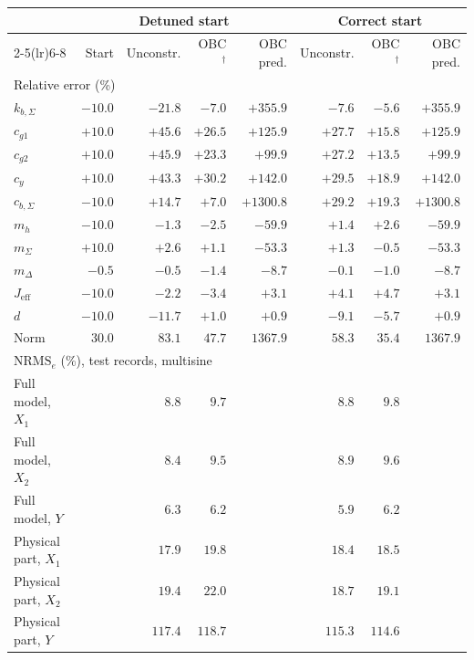 \setlength{\tabcolsep}{3pt}
\begin{tabular}{l r r r r r r r}
\toprule
 & \multicolumn{4}{c}{Detuned start} & \multicolumn{3}{c}{Correct start}\\
\cmidrule(lr){2-5}\cmidrule(lr){6-8}
 & Start & Unconstr. & OBC$^\dagger$ & OBC pred. & Unconstr. & OBC$^\dagger$ & OBC pred.\\
\midrule
\multicolumn{8}{l}{Relative error (\%)}\\
$k_{b,\Sigma}$ & $-10.0$ & $-21.8$ & $-7.0$ & $+355.9$ & $-7.6$ & $-5.6$ & $+355.9$\\
$c_{g1}$ & $+10.0$ & $+45.6$ & $+26.5$ & $+125.9$ & $+27.7$ & $+15.8$ & $+125.9$\\
$c_{g2}$ & $+10.0$ & $+45.9$ & $+23.3$ & $+99.9$ & $+27.2$ & $+13.5$ & $+99.9$\\
$c_y$ & $+10.0$ & $+43.3$ & $+30.2$ & $+142.0$ & $+29.5$ & $+18.9$ & $+142.0$\\
$c_{b,\Sigma}$ & $-10.0$ & $+14.7$ & $+7.0$ & $+1300.8$ & $+29.2$ & $+19.3$ & $+1300.8$\\
$m_h$ & $-10.0$ & $-1.3$ & $-2.5$ & $-59.9$ & $+1.4$ & $+2.6$ & $-59.9$\\
$m_\Sigma$ & $+10.0$ & $+2.6$ & $+1.1$ & $-53.3$ & $+1.3$ & $-0.5$ & $-53.3$\\
$m_\Delta$ & $-0.5$ & $-0.5$ & $-1.4$ & $-8.7$ & $-0.1$ & $-1.0$ & $-8.7$\\
$J_{\mathrm{eff}}$ & $-10.0$ & $-2.2$ & $-3.4$ & $+3.1$ & $+4.1$ & $+4.7$ & $+3.1$\\
$d$ & $-10.0$ & $-11.7$ & $+1.0$ & $+0.9$ & $-9.1$ & $-5.7$ & $+0.9$\\
Norm & $30.0$ & $83.1$ & $47.7$ & $1367.9$ & $58.3$ & $35.4$ & $1367.9$\\
\midrule
\multicolumn{8}{l}{$\mathrm{NRMS}_e$ (\%), test records, multisine}\\
Full model, $X_1$ &  & $8.8$ & $9.7$ &  & $8.8$ & $9.8$ & \\
Full model, $X_2$ &  & $8.4$ & $9.5$ &  & $8.9$ & $9.6$ & \\
Full model, $Y$ &  & $6.3$ & $6.2$ &  & $5.9$ & $6.2$ & \\
Physical part, $X_1$ &  & $17.9$ & $19.8$ &  & $18.4$ & $18.5$ & \\
Physical part, $X_2$ &  & $19.4$ & $22.0$ &  & $18.7$ & $19.1$ & \\
Physical part, $Y$ &  & $117.4$ & $118.7$ &  & $115.3$ & $114.6$ & \\
\midrule

\end{tabular}
